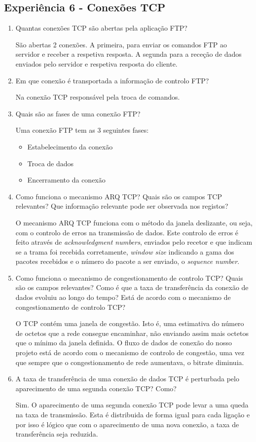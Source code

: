 \documentclass{article}
\begin{document}
\subsection{Experiência 6 - Conexões TCP}
\begin{enumerate}
\item Quantas conexões TCP são abertas pela aplicação FTP?

São abertas 2 conexões. A primeira, para enviar os comandos FTP ao servidor e receber a respetiva resposta.
A segunda para a receção de dados enviados pelo servidor e respetiva resposta do cliente.

\item Em que conexão é transportada a informação de controlo FTP?

Na conexão TCP responsável pela troca de comandos.
\item Quais são as fases de uma conexão FTP?

Uma conexão FTP tem as 3 seguintes fases:
\begin{itemize}
    \item Estabelecimento da conexão
    \item Troca de dados
    \item Encerramento da conexão
\end{itemize}


\item Como funciona o mecanismo ARQ TCP? Quais são os campos TCP relevantes? Que informação relevante pode ser observada nos
registos?

O mecanismo ARQ TCP funciona com o método da janela deslizante, ou seja, com o controlo de erros na transmissão de dados. 
Este controlo de erros é feito através de \textit{acknowledgment numbers}, enviados pelo recetor e que indicam se a trama foi recebida corretamente, \textit{window size} indicando a gama dos pacotes recebidos e o número do pacote a ser enviado, o \textit{sequence number}.

\item Como funciona o mecanismo de congestionamento de controlo TCP? Quais são os campos relevantes? Como é que
a taxa de transferência da conexão de dados evoluiu ao longo do tempo? Está de acordo com o mecanismo de congestionamento de controlo TCP?

O TCP contém uma janela de congestão. Isto é, uma estimativa do número de octetos que a rede consegue encaminhar, não enviando assim mais octetos que o mínimo da janela definida.
O fluxo de dados de conexão do nosso projeto está de acordo com o mecanismo de controlo de congestão, uma vez que sempre que o congestionamento de rede aumentava, o bitrate diminuia.

\item A taxa de transferência de uma conexão de dados TCP é perturbada pelo aparecimento de uma segunda conexão TCP? Como?

Sim. O aparecimento de uma segunda conexão TCP pode levar a uma queda na taxa de transmissão. Esta é distribuida de forma igual para cada ligação e por isso é lógico que com o aparecimento de uma nova conexão, a taxa de transferência seja reduzida.

\end{enumerate}
\end{document}
